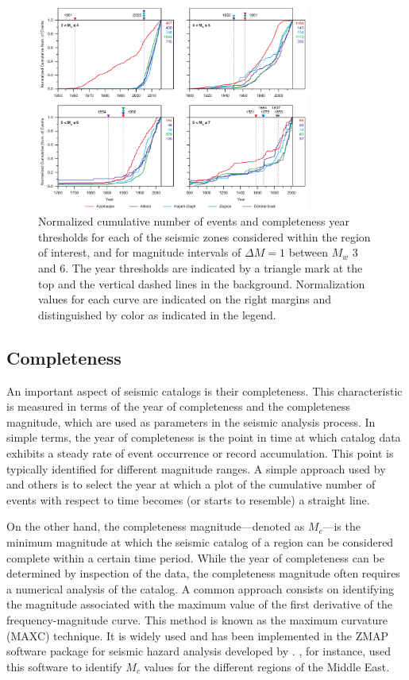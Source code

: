 \begin{figure}[t]
    \centering
    \includegraphics[width=0.8\textwidth]{figures/pdf/figure-05.pdf} 
    \caption{Normalized cumulative number of events and completeness year thresholds for each of the seismic zones considered within the region of interest, and for magnitude intervals of $\Delta M = 1$ between $M_w$ 3 and 6. The year thresholds are indicated by a triangle mark at the top and the vertical dashed lines in the background. Normalization values for each curve are indicated on the right margins and distinguished by color as indicated in the legend.}
    \label{fig:completeness}
\end{figure}

\subsection{Completeness}

An important aspect of seismic catalogs is their completeness. This characteristic is measured in terms of the year of completeness and the completeness magnitude, which are used as parameters in the seismic analysis process. In simple terms, the year of completeness is the point in time at which catalog data exhibits a steady rate of event occurrence or record accumulation. This point is typically identified for different magnitude ranges. A simple approach used by \citet{Frankel1995} and others is to select the year at which a plot of the cumulative number of events with respect to time becomes (or starts to resemble) a straight line.

On the other hand, the completeness magnitude---denoted as $M_c$---is the minimum magnitude at which the seismic catalog of a region can be considered complete within a certain time period. While the year of completeness can be determined by inspection of the data, the completeness magnitude often requires a numerical analysis of the catalog. A common approach consists on identifying the magnitude associated with the maximum value of the first derivative of the frequency-magnitude curve. This method is known as the maximum curvature (MAXC) technique. It is widely used and has been implemented in the ZMAP software package for seismic hazard analysis developed by \citet{Wiemer2001}. \citet{Zare2014}, for instance, used this software to identify $M_c$ values for the different regions of the Middle East.


